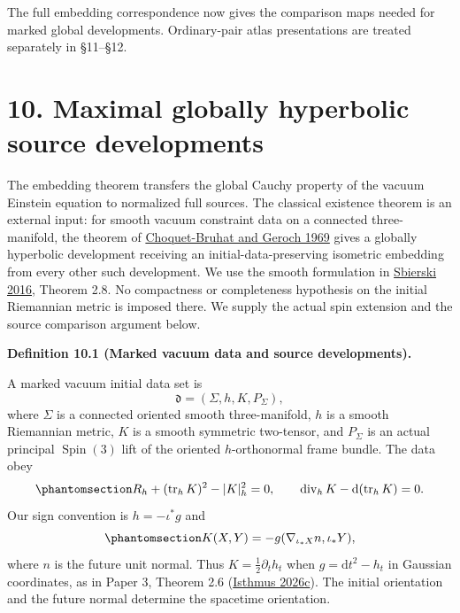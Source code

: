\documentclass[
  english,
  11pt,
  reqno]{amsart}
\makeatletter
\newcommand{\pandocstatementheading}[1]{%
  \par\if@nobreak\else
    \addpenalty{\@beginparpenalty}%
    \addvspace{.5\baselineskip plus .2\baselineskip minus .2\baselineskip}%
  \fi
  {\normalfont\bfseries #1\par}%
  \nobreak\@afterindenttrue\@afterheading
}
\makeatother
\begin{document}
The full embedding correspondence now gives the comparison maps needed
for marked global developments. Ordinary-pair atlas presentations are
treated separately in §11--§12.

\protect{}\label{sec:global-maximal-source-development}

\section{10. Maximal globally hyperbolic source
developments}\label{maximal-globally-hyperbolic-source-developments}

The embedding theorem transfers the global Cauchy property of the vacuum
Einstein equation to normalized full sources. The classical existence
theorem is an external input: for smooth vacuum constraint data on a
connected three-manifold, the theorem of
\hyperref[ref-ChoquetBruhatGeroch1969]{Choquet-Bruhat and Geroch 1969}
gives a globally hyperbolic development receiving an
initial-data-preserving isometric embedding from every other such
development. We use the smooth formulation in
\hyperref[ref-Sbierski2016]{Sbierski 2016}, Theorem 2.8. No compactness
or completeness hypothesis on the initial Riemannian metric is imposed
there. We supply the actual spin extension and the source comparison
argument below.

\pandocstatementheading{\protect{}\label{def:global-marked-vacuum-data}Definition 10.1 (Marked vacuum data and source developments).}

A marked vacuum initial data set is \[
\mathfrak d=(\Sigma,h,K,P_\Sigma),
\] where \(\Sigma\) is a connected oriented smooth three-manifold, \(h\)
is a smooth Riemannian metric, \(K\) is a smooth symmetric two-tensor,
and \(P_\Sigma\) is an actual principal \(\operatorname{Spin}(3)\) lift
of the oriented \(h\)-orthonormal frame bundle. The data obey
\begin{equation}\protect\phantomsection\label{eq:global-marked-vacuum-constraints}{
R_h+(\operatorname{tr}_hK)^2-|K|_h^2=0,
\qquad
\operatorname{div}_hK-\mathrm d(\operatorname{tr}_hK)=0.
}\end{equation} Our sign convention is \(h=-\iota^*g\) and
\begin{equation}\protect\phantomsection\label{eq:global-initial-second-form-sign}{
K(X,Y)=-g(\nabla_{\iota_*X}n,\iota_*Y),
}\end{equation} where \(n\) is the future unit normal. Thus
\(K=\tfrac12\partial_t h_t\) when \(g=\mathrm dt^2-h_t\) in Gaussian
coordinates, as in Paper 3, Theorem 2.6
(\hyperref[ref-IsthmusSmooth2026]{Isthmus 2026c}). The initial
orientation and the future normal determine the spacetime orientation.
\end{document}
